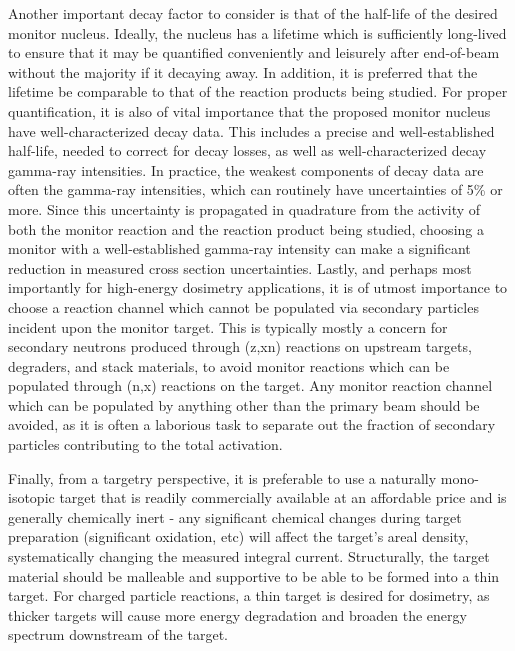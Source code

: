 \documentclass[3p]{elsarticle}
\begin{document}
Another important decay factor to consider is that of the half-life of the desired monitor nucleus.
Ideally, the nucleus has a lifetime which is sufficiently long-lived to ensure that it may be quantified  conveniently and leisurely after end-of-beam without the majority if it decaying away.
In addition, it is preferred that the lifetime be comparable to that of the reaction products being studied. 
For proper quantification, it is also of vital importance that the proposed monitor nucleus have well-characterized decay data.
This includes a precise and well-established half-life,  needed to  correct for decay losses, as well as well-characterized decay gamma-ray intensities.
In practice, the weakest components of decay data are often the gamma-ray intensities, which can routinely have uncertainties of 5\% or more.
Since this uncertainty is propagated in quadrature from the activity of both the monitor reaction and the reaction product being studied, choosing a monitor with a well-established gamma-ray intensity can make a significant reduction in measured cross section uncertainties.
Lastly, and perhaps most importantly for high-energy dosimetry applications, it is  of utmost importance to choose a reaction channel which cannot be populated via secondary particles incident upon the monitor target.
This is typically mostly a concern for secondary neutrons produced through (z,xn) reactions on upstream targets, degraders, and stack materials, to avoid monitor reactions which can be populated through (n,x) reactions on the target.
Any monitor reaction channel which can be populated by anything other than the primary beam should be avoided, as it is often a laborious task to separate out the fraction of secondary particles contributing to the total activation.  



Finally, from a targetry  perspective, it is preferable to use a naturally mono-isotopic target that is readily commercially available at an affordable price and is generally chemically inert - any significant chemical changes during target preparation (significant oxidation, etc) will affect the target's areal density, systematically changing the measured integral current. 
Structurally, the target material should be malleable and supportive to be able to be formed into a thin target.
For charged particle reactions, a thin target is desired for dosimetry, as thicker targets will cause more energy degradation and broaden the energy spectrum downstream of the target.
\end{document}
